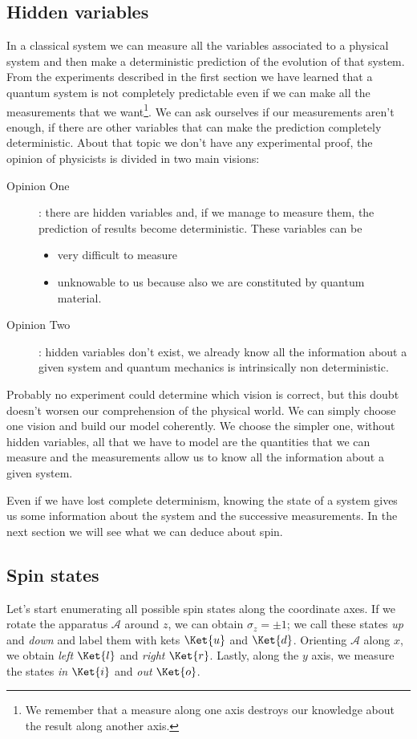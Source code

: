 \subsection{Hidden variables}
In a classical system we can measure all the variables associated to a physical system and then make a deterministic prediction of the evolution of that system. From the experiments described in the first section we have learned that a quantum system is not completely predictable even if we can make all the measurements that we want\footnote{We remember that a measure along one axis destroys our knowledge about the result along another axis.}. We can ask ourselves if our measurements aren't enough, if there are other variables that can make the prediction completely deterministic. About that topic we don't have any experimental proof, the opinion of physicists is divided in two main visions:
\begin{description}
	\item[Opinion One]: there are hidden variables and, if we manage to measure them, the prediction of results become deterministic. These variables can be 
	\begin{itemize}
		\item very difficult to measure
		\item unknowable to us because also we are constituted by quantum material.
	\end{itemize}
	\item[Opinion Two]: hidden variables don't exist, we already know all the information about a given system and quantum mechanics is intrinsically non deterministic.
\end{description}

Probably no experiment could determine which vision is correct, but this doubt doesn't worsen our comprehension of the physical world. We can simply choose one vision and build our model coherently. We choose the simpler one, without hidden variables, all that we have to model are the quantities that we can measure and the measurements allow us to know all the information about a given system.

Even if we have lost complete determinism, knowing the state of a system gives us some information about the system and the successive measurements. In the next section we will see what we can deduce about spin.

\subsection{Spin states}
Let's start enumerating all possible spin states along the coordinate axes. If we rotate the apparatus $\mathcal{A}$ around $z$, we can obtain $\sigma_z = \pm 1$; we call these states \emph{up} and \emph{down} and label them with kets $\Ket{u}$ and $\Ket{d}$. Orienting $\mathcal{A}$ along $x$, we obtain \emph{left} $\Ket{l}$ and \emph{right} $\Ket{r}$. Lastly, along the $y$ axis, we measure the states \emph{in} $\Ket{i}$ and \emph{out} $\Ket{o}$.

